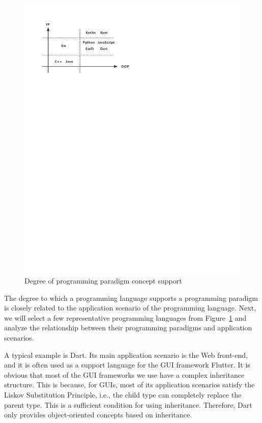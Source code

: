 \begin{figure}[htbp]
    \centerline{\includegraphics[scale=0.8]{figures/paradigm}}
    \caption{Degree of programming paradigm concept support}
    \label{fig:paradigm}
\end{figure}

The degree to which a programming language supports a programming paradigm is closely related
to the application scenario of the programming language.
Next, we will select a few representative programming languages from Figure~\ref{fig:paradigm} and analyze the
relationship between their programming paradigms and application scenarios.


A typical example is Dart. Its main application scenario is the Web front-end, and it is often used as a support language for the GUI framework Flutter. It is obvious that most of the GUI frameworks we use have a complex inheritance structure. This is because, for GUIs, most of its application scenarios satisfy the Liskov Substitution Principle, i.e., the child type can completely replace the parent type. This is a sufficient condition for using inheritance. Therefore, Dart only provides object-oriented concepts based on inheritance.

